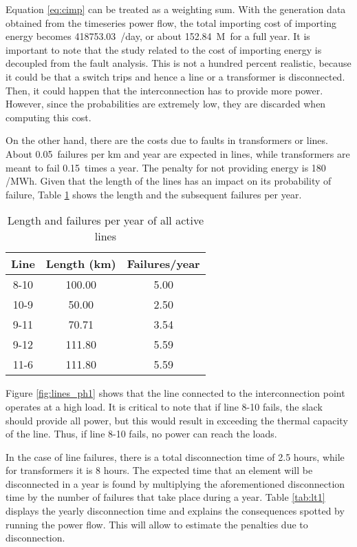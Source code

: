 Equation \ref{eq:cimp} can be treated as a weighting sum. With the generation data obtained from the timeseries power flow, the total importing cost of importing energy becomes 418753.03~\texteuro/day, or about 152.84~M\texteuro \ for a full year. It is important to note that the study related to the cost of importing energy is decoupled from the fault analysis. This is not a hundred percent realistic, because it could be that a switch trips and hence a line or a transformer is disconnected. Then, it could happen that the interconnection has to provide more power. However, since the probabilities are extremely low, they are discarded when computing this cost. 

On the other hand, there are the costs due to faults in transformers or lines. About 0.05~failures per km and year are expected in lines, while transformers are meant to fail 0.15~times a year. The penalty for not providing energy is 180 \texteuro/MWh. Given that the length of the lines has an impact on its probability of failure, Table \ref{tab:ll1} shows the length and the subsequent failures per year.

\begin{table}[!htb]\centering
  \begin{tabular}[]{ccc}
    \hline 
    \textbf{Line} & \textbf{Length (km)} & \textbf{Failures/year} \\
    \hline
    8-10 & 100.00 & 5.00 \\
    10-9 & 50.00 & 2.50 \\
    9-11 & 70.71 & 3.54 \\
    9-12 & 111.80 & 5.59 \\
    11-6 & 111.80 & 5.59 \\
    \hline
  \end{tabular}
  \caption{Length and failures per year of all active lines}
  \label{tab:ll1}
\end{table}
Figure \ref{fig:lines_ph1} shows that the line connected to the interconnection point operates at a high load. It is critical to note that if line 8-10 fails, the slack should provide all power, but this would result in exceeding the thermal capacity of the line. Thus, if line 8-10 fails, no power can reach the loads. 
 

In the case of line failures, there is a total disconnection time of 2.5 hours, while for transformers it is 8 hours. The expected time that an element will be disconnected in a year is found by multiplying the aforementioned disconnection time by the number of failures that take place during a year. Table \ref{tab:lt1} displays the yearly disconnection time and explains the consequences spotted by running the power flow. This will allow to estimate the penalties due to disconnection. 

